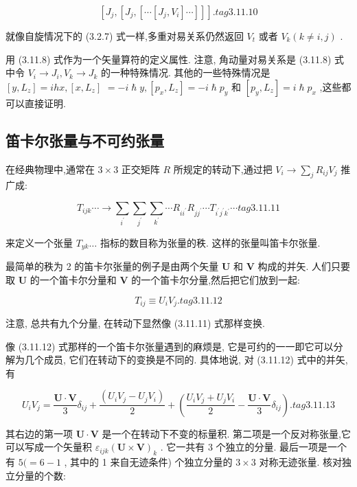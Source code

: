 $$
\left\lbrack {{J}_{j},\left\lbrack {{J}_{j},\left\lbrack {\cdots \left\lbrack {{J}_{j},{V}_{i}}\right\rbrack \cdots }\right\rbrack }\right\rbrack }\right\rbrack \text{.} tag{3.11.10}
$$

就像自旋情况下的 (3.2.7) 式一样,多重对易关系仍然返回 ${V}_{t}$ 或者 ${V}_{k}\left( {k \neq i, j}\right)$ .

用 (3.11.8) 式作为一个矢量算符的定义属性. 注意, 角动量对易关系是 (3.11.8) 式中令 ${V}_{i} \rightarrow {J}_{i},{V}_{k} \rightarrow {J}_{k}$ 的一种特殊情况. 其他的一些特殊情况是 $\left\lbrack {y,{L}_{z}}\right\rbrack = {ihx},\left\lbrack {x,{L}_{z}}\right\rbrack$ $= - i\hslash y,\left\lbrack {{p}_{x},{L}_{z}}\right\rbrack = - i\hslash {p}_{y}$ 和 $\left\lbrack {{p}_{y},{L}_{z}}\right\rbrack = i\hslash {p}_{x}$ ,这些都可以直接证明.

\subsection{笛卡尔张量与不可约张量}

在经典物理中,通常在 $3 \times 3$ 正交矩阵 $R$ 所规定的转动下,通过把 ${V}_{i} \rightarrow {\sum }_{j}{R}_{ij}{V}_{j}$ 推广成:

$$
{T}_{ijk}\cdots \rightarrow \mathop{\sum }\limits_{{i}^{\prime }}\mathop{\sum }\limits_{{j}^{\prime }}\mathop{\sum }\limits_{{k}^{\prime }}\cdots {R}_{i{i}^{\prime }}{R}_{j{j}^{\prime }}\cdots {T}_{{i}^{\prime }{j}^{\prime }{k}^{\prime }}\cdots tag{3.11.11}
$$

来定义一个张量 ${T}_{yk}\ldots$ 指标的数目称为张量的秩. 这样的张量叫笛卡尔张量.

最简单的秩为 2 的笛卡尔张量的例子是由两个矢量 $\mathbf{U}$ 和 $\mathbf{V}$ 构成的并矢. 人们只要取 $\mathbf{U}$ 的一个笛卡尔分量和 $\mathbf{V}$ 的一个笛卡尔分量,然后把它们放到一起:

$$
{T}_{ij} \equiv {U}_{i}{V}_{j}. tag{3.11.12}
$$

注意, 总共有九个分量, 在转动下显然像 (3.11.11) 式那样变换.

像 (3.11.12) 式那样的一个笛卡尔张量遇到的麻烦是, 它是可约的一一即它可以分解为几个成员, 它们在转动下的变换是不同的. 具体地说, 对 (3.11.12) 式中的并矢, 有

$$
{U}_{i}{V}_{j} = \frac{\mathbf{U} \cdot \mathbf{V}}{3}{\delta }_{ij} + \frac{\left( {U}_{i}{V}_{j} - {U}_{j}{V}_{i}\right) }{2} + \left( {\frac{{U}_{i}{V}_{j} + {U}_{j}{V}_{i}}{2} - \frac{\mathbf{U} \cdot \mathbf{V}}{3}{\delta }_{ij}}\right) . tag{3.11.13}
$$

其右边的第一项 $\mathbf{U} \cdot \mathbf{V}$ 是一个在转动下不变的标量积. 第二项是一个反对称张量,它可以写成一个矢量积 ${\varepsilon }_{ijk}{\left( \mathbf{U} \times \mathbf{V}\right) }_{k}$ . 它一共有 3 个独立的分量. 最后一项是一个有 $5( = 6 - 1$ , 其中的 1 来自无迹条件) 个独立分量的 $3 \times 3$ 对称无迹张量. 核对独立分量的个数:

